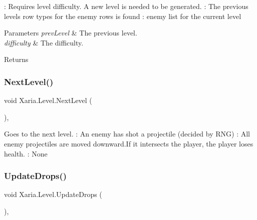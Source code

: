 \+: Requires level difficulty. A new level is needed to be generated. \+: The previous level\textquotesingle{}s row types for the enemy rows is found \+: enemy list for the current level 


\begin{DoxyParams}{Parameters}
{\em prev\+Level} & The previous level.\\
\hline
{\em difficulty} & The difficulty.\\
\hline
\end{DoxyParams}
\begin{DoxyReturn}{Returns}

\end{DoxyReturn}
\mbox{\label{classXaria_1_1Level_ab1b45e8eacae455500518158aceadeba}} 
\subsubsection{\texorpdfstring{Next\+Level()}{NextLevel()}}
{\footnotesize\ttfamily void Xaria.\+Level.\+Next\+Level (\begin{DoxyParamCaption}{ }\end{DoxyParamCaption})\hspace{0.3cm}{\ttfamily [inline]}, {\ttfamily [private]}}



Goes to the next level. \+: An enemy has shot a projectile (decided by R\+NG) \+: All enemy projectiles are moved downward.\+If it intersects the player, the player loses health. \+: None 

\mbox{\label{classXaria_1_1Level_a066f8459e44939f3d2851427dfc3423e}} 
\subsubsection{\texorpdfstring{Update\+Drops()}{UpdateDrops()}}
{\footnotesize\ttfamily void Xaria.\+Level.\+Update\+Drops (\begin{DoxyParamCaption}{ }\end{DoxyParamCaption})\hspace{0.3cm}{\ttfamily [inline]}, {\ttfamily [private]}}



